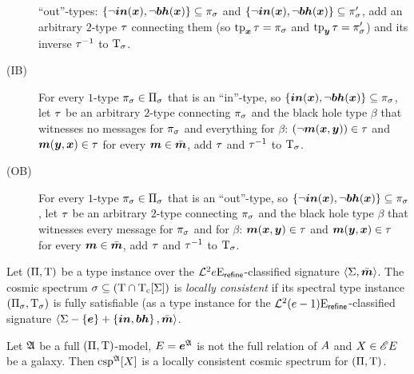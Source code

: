\begin{definition}
\begin{description}
  ``out''-types:
  $\left\{\lnot\bm{in}(\bm{x}),\lnot\bm{bh}(\bm{x})\right\} \subseteq \pi_\sigma$ and
  $\left\{\lnot\bm{in}(\bm{x}),\lnot\bm{bh}(\bm{x})\right\} \subseteq \pi_\sigma'$, add an arbitrary 
  $2$-type $\tau$ connecting them (so $\operatorname{tp}_{\bm{x}}\tau = \pi_\sigma$ and $\operatorname{tp}_{\bm{y}}\tau
  = \pi_\sigma'$) and its inverse $\tau^{-1}$ to $\mathrm{T}_\sigma$.
  \item[(IB)] For every $1$-type $\pi_\sigma \in
  \Pi_\sigma$ that is an ``in''-type, so
  $\left\{\bm{in}(\bm{x}),\lnot\bm{bh}(\bm{x})\right\} \subseteq \pi_\sigma$, let $\tau$ be an
  arbitrary $2$-type connecting $\pi_\sigma$ and the black hole type $\beta$
  that witnesses no messages for $\pi_\sigma$ and everything for $\beta$:
  $(\lnot\bm{m}(\bm{x},\bm{y})) \in \tau$ and $\bm{m}(\bm{y},\bm{x}) \in \tau$ for every $\bm{m}
  \in \bar{\bm{m}}$, add $\tau$ and $\tau^{-1}$ to $\mathrm{T}_\sigma$.
  \item[(OB)] For every $1$-type $\pi_\sigma \in
  \Pi_\sigma$ that is an ``out''-type, so
  $\left\{\lnot\bm{in}(\bm{x}),\lnot\bm{bh}(\bm{x})\right\} \subseteq \pi_\sigma$,
  let $\tau$ be an arbitrary $2$-type connecting $\pi_\sigma$ and the black
  hole type $\beta$ that witnesses every message for $\pi_\sigma$ and for
  $\beta$: $\bm{m}(\bm{x},\bm{y}) \in \tau$ and $\bm{m}(\bm{y},\bm{x}) \in \tau$ for every $\bm{m}
  \in \bar{\bm{m}}$, add $\tau$ and $\tau^{-1}$ to $\mathrm{T}_\sigma$.
\end{description}
\end{definition}
\begin{definition}
Let $(\Pi,\mathrm{T})$ be a type instance over the
$\mathcal{L}^{2}_{{}}{e}\mathrm{E}_{\mathsf{refine}}$-classified signature $\left\langle \mathrm{\Sigma},\bar{\bm{m}} \right\rangle$.
The cosmic spectrum $\sigma \subseteq (\mathrm{T} \cap \mathrm{T}_{\mathrm{c}}[\mathrm{\Sigma}])$ is
\emph{locally consistent} if its spectral type instance
$(\Pi_\sigma, \mathrm{T}_\sigma)$ is fully satisfiable (as a type instance for the
$\mathcal{L}^{2}_{{}}{(e-1)}\mathrm{E}_{\mathsf{refine}}$-classified signature
$\left\langle \mathrm{\Sigma} - \left\{\bm{e}\right\} + \left\{\bm{in}, \bm{bh}\right\},\bar{\bm{m}} \right\rangle$.
\end{definition}
\begin{remark}
Let $\mathfrak{A}$ be a full $(\Pi,\mathrm{T})$-model, $E = \bm{e}^{\mathfrak{A}}$ is not the
full relation of $A$ and $X \in {\mathscr{E}E}$ be a galaxy. Then
$\operatorname{csp}^{\mathfrak{A}}[X]$ is a locally consistent cosmic spectrum for $(\Pi,\mathrm{T})$.
\end{remark}
